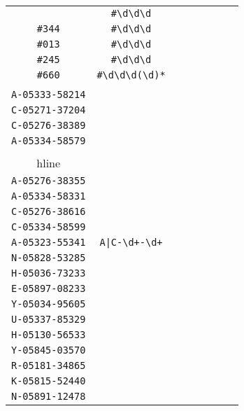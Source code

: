 \begin{longtable}{cccccccc}
\begin{tabular}{ll}
    \verb|#054| & \verb|#\d\d\d|\\
\verb|#344| & \verb|#\d\d\d|\\
\verb|#013| & \verb|#\d\d\d|\\
\verb|#245| & \verb|#\d\d\d|\\
\verb|#660| & \verb|#\d\d\d(\d)*|
\end{tabular}
\\\midrule 
\begin{tabular}{l}
    \verb|A-05334-58432|\\
\verb|A-05333-58214|\\
\verb|C-05271-37204|\\
\verb|C-05276-38389|\\
\verb|A-05334-58579|\\
\\hline\\
\verb|A-05276-38355|\\
\verb|A-05334-58331|\\
\verb|C-05276-38616|\\
\verb|C-05334-58599|\\
\verb|A-05323-55341|
\end{tabular}

&
\verb.A|C-\d+-\d+.
&

\begin{tabular}{l}
    \verb|\u-05\d\d\d-\d\d\d\d\d|\\
\verb|N-05828-53285|\\
\verb|H-05036-73233|\\
\verb|E-05897-08233|\\
\verb|Y-05034-95605|\\
\verb|U-05337-85329|
\end{tabular}

&

\begin{tabular}{l}
    \verb|\u-05\d\d\d-\d\d\d\d\d|\\
\verb|H-05130-56533|\\
\verb|Y-05845-03570|\\
\verb|R-05181-34865|\\
\verb|K-05815-52440|\\
\verb|N-05891-12478|
\end{tabular}

&


\end{longtable}
